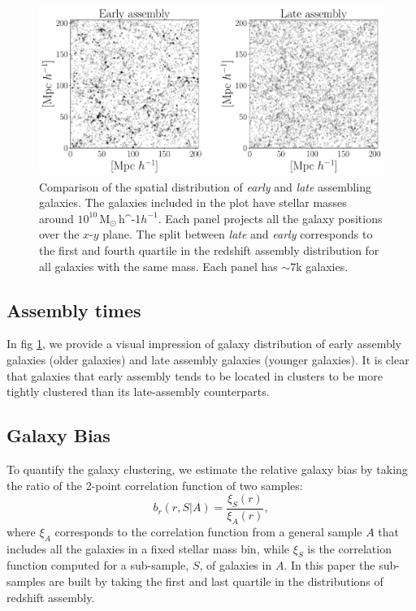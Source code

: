 \documentclass[fleqn,usenatbib]{mnras}
\newcommand{\Msunh}{\,{\rm M}$_{\odot}$\,\ifmmode h^{-1}\else $h^{-1}$\fi}
\begin{document}
 \begin{figure}
    \centering
    \includegraphics[width=1.8\columnwidth]{figuras/scatter_assembly.pdf}
    \caption{Comparison of the spatial distribution of \emph{early} and \emph{late} assembling galaxies.
    The galaxies included in the plot have stellar masses around $10^{10}$\Msunh. 
    Each panel projects all the galaxy positions over the $x$-$y$ plane. 
    The split between \emph{late} and \emph{early} corresponds to the first and fourth quartile in the redshift assembly distribution for all galaxies with the same mass.
    Each panel has $\sim7$k galaxies. }
    \label{fig:comparison}
\end{figure}


\subsection{Assembly times}
\label{sec:assembly_times}





In fig \ref{fig:comparison}, we provide a visual impression of galaxy
distribution of early assembly galaxies (older galaxies) and late
assembly galaxies (younger galaxies). It is clear that galaxies that
early assembly tends to be located in clusters to be more tightly
clustered than its late-assembly counterparts. 



\subsection{Galaxy Bias}
To quantify the galaxy clustering, we estimate the relative galaxy
bias by taking the ratio of the 2-point correlation function of two
samples: 
%
\begin{equation}
b_r(r, S|A)= \frac{\xi_S(r)}{\xi_A(r)}, 
\label{eq:relative}
\end{equation}
%
where $\xi_A$ corresponds to the correlation function from a general
sample $A$ that includes all the galaxies in a fixed stellar mass bin,
while $\xi_S$ is the correlation function computed for a sub-sample,
$S$, of galaxies in $A$. In this paper the sub-samples are built by
taking the first and last quartile in the distributions of redshift
assembly. 
\end{document}
